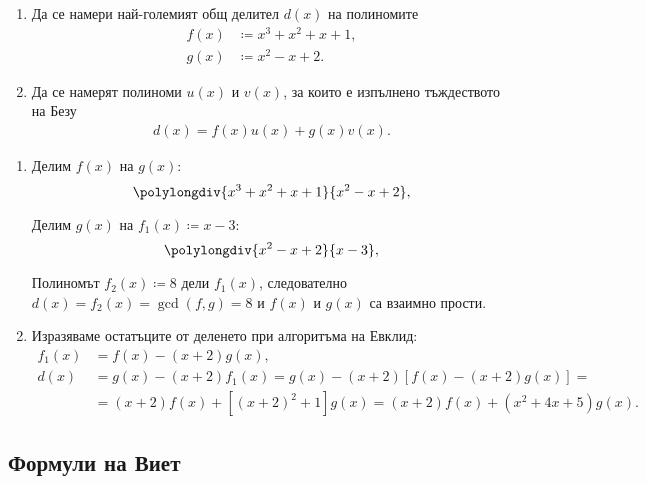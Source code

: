 \documentclass[numbers=endperiod, bibliography=totocnumbered]{scrartcl}
\begin{document}
\begin{exercise}
  \mbox{}
  \begin{enumerate}
    \item Да се намери най-големият общ делител \( d(x) \) на полиномите
    \begin{align*}
      f(x) &\coloneqq x^3 + x^2 + x + 1, \\
      g(x) &\coloneqq x^2 - x + 2.
    \end{align*}

    \item Да се намерят полиноми \( u(x) \) и \( v(x) \), за които е изпълнено тъждеството на Безу
    \begin{align*}
      d(x) = f(x) u(x) + g(x) v(x).
    \end{align*}
  \end{enumerate}
\end{exercise}
\begin{solution}
  \mbox{}
  \begin{enumerate}
    \item Делим \( f(x) \) на \( g(x) \):
    \begin{displaymath}
      \polylongdiv {x^3 + x^2 + x + 1} {x^2 - x + 2},
    \end{displaymath}

    Делим \( g(x) \) на \( f_1(x) \coloneqq x - 3 \):
    \begin{displaymath}
      \polylongdiv {x^2 - x + 2} {x - 3},
    \end{displaymath}

    Полиномът \( f_2(x) \coloneqq 8 \) дели \( f_1(x) \), следователно \( d(x) = f_2(x) = \gcd(f, g) = 8 \) и \( f(x) \) и \( g(x) \) са взаимно прости.

    \item Изразяваме остатъците от деленето при алгоритъма на Евклид:
    \begin{align*}
      f_1(x)
      &=
      f(x) - (x + 2) g(x),
      \\
      d(x)
      &=
      g(x) - (x + 2) f_1(x)
      =
      g(x) - (x + 2) [f(x) - (x + 2) g(x)]
      = \\ &=
      (x + 2) f(x) + [{(x + 2)}^2 + 1] g(x)
      =
      \boxed{(x + 2) f(x) + (x^2 + 4x + 5) g(x)}.
    \end{align*}
  \end{enumerate}
\end{solution}

\subsection{Формули на Виет}
\end{document}
